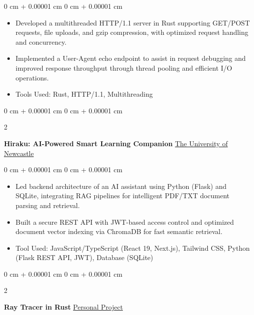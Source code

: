 \documentclass[10pt, letterpaper]{article}
\newenvironment{highlights}{
    \begin{itemize}[
        topsep=0.10 cm,
        parsep=0.10 cm,
        partopsep=0pt,
        itemsep=0pt,
        leftmargin=0 cm + 10pt
    ]
}{
    \end{itemize}
} %
\newenvironment{onecolentry}{
    \begin{adjustwidth}{
        0 cm + 0.00001 cm
    }{
        0 cm + 0.00001 cm
    }
}{
    \end{adjustwidth}
} %
\newenvironment{twocolentry}[2][]{
    \onecolentry
    \def\secondColumn{#2}
    \setcolumnwidth{\fill, 4.5 cm}
    \begin{paracol}{2}
}{
    \switchcolumn \raggedleft \secondColumn
    \end{paracol}
    \endonecolentry
} %
\begin{document}
        \vspace{0.10 cm}
        \begin{onecolentry}
            \begin{highlights}
                \item Developed a multithreaded HTTP/1.1 server in Rust supporting GET/POST requests, file uploads, and gzip compression, with optimized request handling and concurrency.
                \item Implemented a User-Agent echo endpoint to assist in request debugging and improved response throughput through thread pooling and efficient I/O operations.
                \item Tools Used: Rust, HTTP/1.1, Multithreading
            \end{highlights}
        \end{onecolentry}


        \vspace{0.2 cm}
        
        \begin{twocolentry}{
            \href{https://github.com/yuann3/Hiraku-RAG}{The University of Newcastle}
        }
            \textbf{Hiraku: AI-Powered Smart Learning Companion}\end{twocolentry}

        \vspace{0.10 cm}
        \begin{onecolentry}
            \begin{highlights}
                \item Led backend architecture of an AI assistant using Python (Flask) and SQLite, integrating RAG pipelines for intelligent PDF/TXT document parsing and retrieval.
                \item Built a secure REST API with JWT-based access control and optimized document vector indexing via ChromaDB for fast semantic retrieval.
                \item Tool Used: JavaScript/TypeScript (React 19, Next.js), Tailwind CSS, Python (Flask REST API, JWT), Database (SQLite)
            \end{highlights}
        \end{onecolentry}


        \vspace{0.2 cm}

        \begin{twocolentry}{
            \href{https://github.com/yuann3/RayRust}{Personal Project}
        }
            \textbf{Ray Tracer in Rust}\end{twocolentry}
\end{document}

